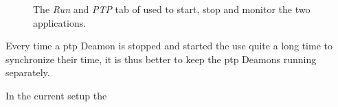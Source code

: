 \begin{figure}[H]
    \caption{The \textit{Run} and \textit{PTP} tab of \srgui used to start, stop and monitor the two \py applications.}
    \label{fig:gui_map}
\end{figure}

Every time a \gls{ptp} Deamon is stopped and started the \cams use quite a long time to synchronize their time, it is thus better to keep the \gls{ptp} Deamons running separately.

In the current setup the